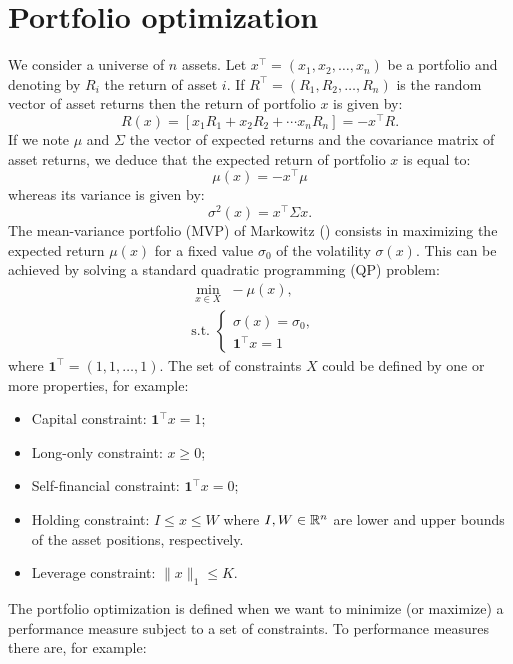 \section{Portfolio optimization}

We consider a universe of $n$ assets. Let $x^\top = (x_1, x_2, \dots, x_n)$ be a portfolio and denoting by $R_i$ the return of asset $i$. If $R^\top=(R_1, R_2, \dots, R_n)$  is the random vector of asset returns then the return of portfolio $x$ is given by:
\[
	R(x) = [x_1R_1+x_2R_2+\cdots x_nR_n] = -x^\top R.
\]
If we note $\mu$ and $\Sigma$ the vector of expected returns and the covariance matrix of asset returns, we deduce that the expected return of portfolio $x$ is equal to:
\[
	\mu(x) = -x^\top \mu
\]
whereas its variance is given by:
\[
	\sigma^2(x) = x^\top \Sigma x.
\]
The mean-variance portfolio (MVP) of Markowitz (\cite{Markowitz1952}) consists in maximizing the expected return $\mu(x)$ for a fixed value $\sigma_0$ of the volatility $\sigma(x)$. This can be achieved by solving a standard quadratic programming (QP) problem:
\begin{eqnarray}\label{prob:MVP}
	\min_{x\in X} \,\, - \mu(x), \\
	\mbox{s.t. }\left\{
	\begin{aligned}\nonumber
		\sigma(x) = \sigma_0, & \\
		\mathbf{1}^\top x=1   &
	\end{aligned}
	\right.
\end{eqnarray}
where $\textbf{1}^\top =(1,1,\dots,1)$. The set of constraints $X$ could be defined by one or more properties, for example:
\begin{itemize}
	\item Capital constraint: $\textbf{1}^\top x=1$;
	\item Long-only constraint: $x\geq0$;
	\item Self-financial constraint: $\textbf{1}^\top x=0$;
	\item Holding constraint: $I\leq x\leq W$ where $I,W\in\mathbb{R}^n$ are lower and upper bounds of the asset positions, respectively.
	\item Leverage constraint: $\|x\|_1\leq K$.
\end{itemize}

The portfolio optimization is defined when we want to minimize (or maximize) a performance measure subject to a set of constraints. To performance measures there are, for example:

